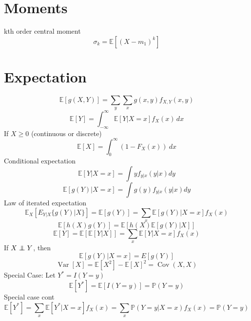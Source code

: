 \documentclass[twocolumn]{amsart}
\newcommand{\E}{\mathbb{E}}
\renewcommand{\P}{\mathbb{P}}
\newcommand{\Cov}{\operatorname{Cov}}
\newcommand{\Var}{\operatorname{Var}}
\newcommand\independent{\protect\mathpalette{\protect\independenT}{\perp}}
\def\independenT#1#2{\mathrel{\rlap{$#1#2$}\mkern3mu{#1#2}}}
\begin{document}
\pagestyle{empty}
\thispagestyle{empty}

\section*{Moments}
kth order central moment
\begin{equation*}
  \sigma_{k} = \E[(X-m_{1})^{k}]
\end{equation*}

\section*{Expectation}
\begin{equation*}
  \E[g(X,Y)] = \sum_{y}\sum_{x}g(x,y)f_{X,Y}(x,y)
\end{equation*}
\begin{equation*}
  \E[Y] = \int_{-\infty}^{\infty}\E[Y|X=x]f_{X}(x)\,dx
\end{equation*}
If $X\geq 0$ (continuous or discrete)
\begin{equation*}
  \E[X] = \int_{0}^{\infty}(1-F_{X}(x))~dx
\end{equation*}
Conditional expectation
\begin{equation*}
  \E[Y|X=x] = \int y f_{y|x}(y|x)dy
\end{equation*}
\begin{equation*}
  \E[g(Y)|X=x] = \int g(y) f_{y|x}(y|x)dy
\end{equation*}
Law of iterated expectation
\begin{equation*}
  \E_{X}[E_{Y|X}\{g(Y)|X\}] = \E[g(Y)] = \sum_{x}\E[g(Y)|X=x]f_{X}(x)
\end{equation*}
\begin{equation*}
  \E[h(X)g(Y)] = \E[h(X)\E[g(Y)|X]]
\end{equation*}
\begin{equation*}
  \E[Y]=\E[\E[Y|X]] = \sum_{x}\E[Y|X = x]f_{X}(x)
\end{equation*}
If \(X \independent Y\), then
\begin{equation*}
  \E[g(Y) | X=x] = E[g(Y)]
\end{equation*}
\begin{equation*}
  \Var[X] = \E[X^{2}] - \E[X]^{2} = \Cov(X,X)
\end{equation*}
Special Case: Let $Y^{*} = I(Y=y)$
\begin{equation*}
  \E[Y^{*}] = \E[I(Y=y)] = \P(Y=y)
\end{equation*}
Special case cont
\begin{equation*}
  \E[Y^{*}] = \sum_{x}\E[Y^{*}|X=x]f_{X}(x) = \sum_{x}\P(Y=y|X=x)f_{X}(x) =
  \P(Y=y)
\end{equation*}
\end{document}
